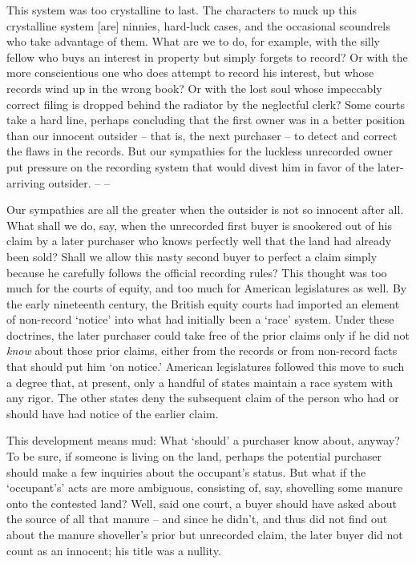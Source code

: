 This system was too crystalline to last. The characters to muck up this
crystalline system [are] ninnies, hard-luck cases, and the occasional
scoundrels who take advantage of them. What are we to do, for example, with the
silly fellow who buys an interest in property but simply forgets to record? Or
with the more conscientious one who does attempt to record his interest, but
whose records wind up in the wrong book? Or with the lost soul whose impeccably
correct filing is dropped behind the radiator by the neglectful clerk? Some
courts take a hard line, perhaps concluding that the first owner was in a
better position than our innocent outsider -- that is, the next purchaser -- to
detect and correct the flaws in the records. But our sympathies for the
luckless unrecorded owner put pressure on the recording system that would
divest him in favor of the later-arriving outsider.  {}-- -- 

Our sympathies are all the greater when the outsider is not so innocent after
all. What shall we do, say, when the unrecorded first buyer is snookered out of
his claim by a later purchaser who knows perfectly well that the land had
already been sold? Shall we allow this nasty second buyer to perfect a claim
simply because he carefully follows the official recording rules? This thought
was too much for the courts of equity, and too much for American legislatures
as well. By the early nineteenth century, the British equity courts had
imported an element of non-record `notice' into what had initially been a
`race' system. Under these doctrines, the later purchaser could take free of
the prior claims only if he did not \textit{know} about those prior claims,
either from the records or from non-record facts that should put him `on
notice.' American legislatures followed this move to such a degree that, at
present, only a handful of states maintain a race system with any rigor. The
other states deny the subsequent claim of the person who had or should have had
notice of the earlier claim. 

This development means mud: What `should' a purchaser know about, anyway? To be
sure, if someone is living on the land, perhaps the potential purchaser should
make a few inquiries about the occupant's status. But what if the `occupant's'
acts are more ambiguous, consisting of, say, shovelling some manure onto the
contested land? Well, said one court, a buyer should have asked about the
source of all that manure -- and since he didn't, and thus did not find out
about the manure shoveller's prior but unrecorded claim, the later buyer did
not count as an innocent; his title was a nullity. 

